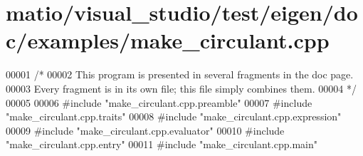 \hypertarget{matio_2visual__studio_2test_2eigen_2doc_2examples_2make__circulant_8cpp_source}{}\section{matio/visual\+\_\+studio/test/eigen/doc/examples/make\+\_\+circulant.cpp}
\label{matio_2visual__studio_2test_2eigen_2doc_2examples_2make__circulant_8cpp_source}

\begin{DoxyCode}
00001 \textcolor{comment}{/*}
00002 \textcolor{comment}{This program is presented in several fragments in the doc page.}
00003 \textcolor{comment}{Every fragment is in its own file; this file simply combines them.}
00004 \textcolor{comment}{*/}
00005 
00006 \textcolor{preprocessor}{#include "make\_circulant.cpp.preamble"}
00007 \textcolor{preprocessor}{#include "make\_circulant.cpp.traits"}
00008 \textcolor{preprocessor}{#include "make\_circulant.cpp.expression"}
00009 \textcolor{preprocessor}{#include "make\_circulant.cpp.evaluator"}
00010 \textcolor{preprocessor}{#include "make\_circulant.cpp.entry"}
00011 \textcolor{preprocessor}{#include "make\_circulant.cpp.main"}
\end{DoxyCode}
